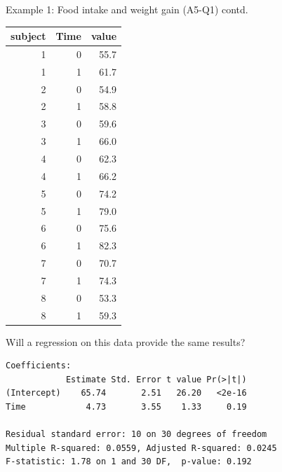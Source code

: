 \documentclass{beamer}\usepackage[]{graphicx}\usepackage[]{color}
\newenvironment{knitrout}{}{} %
\begin{document}
\begin{frame}[fragile]{Example 1: Food intake and weight gain (A5-Q1) contd.}

\begin{minipage}{0.47\textwidth}




\begin{knitrout}\scriptsize
{}\color{fgcolor}
\begin{tabular}{r|r|r}
\hline
subject & Time & value\\
\hline
1 & 0 & 55.7\\
\hline
1 & 1 & 61.7\\
\hline
2 & 0 & 54.9\\
\hline
2 & 1 & 58.8\\
\hline
3 & 0 & 59.6\\
\hline
3 & 1 & 66.0\\
\hline
4 & 0 & 62.3\\
\hline
4 & 1 & 66.2\\
\hline
5 & 0 & 74.2\\
\hline
5 & 1 & 79.0\\
\hline
6 & 0 & 75.6\\
\hline
6 & 1 & 82.3\\
\hline
7 & 0 & 70.7\\
\hline
7 & 1 & 74.3\\
\hline
8 & 0 & 53.3\\
\hline
8 & 1 & 59.3\\
\hline
\end{tabular}


\end{knitrout}

\vspace*{1cm}

\small
Will a regression on this data provide the same results?

	
\end{minipage}
\begin{minipage}{0.5\textwidth}
	\pause 
	
\begin{knitrout}\tiny
{}\color{fgcolor}
\begin{verbatim}
Coefficients:
            Estimate Std. Error t value Pr(>|t|)
(Intercept)    65.74       2.51   26.20   <2e-16
Time            4.73       3.55    1.33     0.19

Residual standard error: 10 on 30 degrees of freedom
Multiple R-squared: 0.0559,	Adjusted R-squared: 0.0245 
F-statistic: 1.78 on 1 and 30 DF,  p-value: 0.192 
\end{verbatim}


\end{knitrout}
\end{minipage}
\end{frame}
\end{document}
